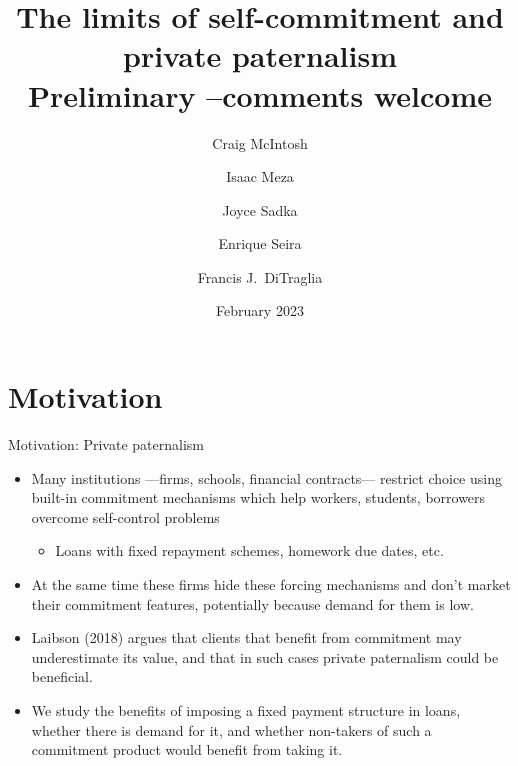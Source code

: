 \documentclass[8pt]{beamer}
\title{The limits of self-commitment and private paternalism \\
Preliminary --comments welcome}
\author{Craig McIntosh \and Isaac Meza \and Joyce Sadka \and Enrique Seira \and Francis J.\ DiTraglia }
\date{February 2023}
\begin{document}
\begin{frame}[c, noframenumbering]%
\titlepage
\end{frame}


\section{Motivation}



\begin{frame}{Motivation: Private paternalism}
\begin{itemize}
    \vfill \item Many institutions —firms, schools, financial contracts— restrict choice using built-in commitment mechanisms which help workers, students, borrowers overcome self-control problems
    \begin{itemize}
        \item Loans with fixed repayment schemes, homework due dates, etc.
    \end{itemize}
    \vfill\item At the same time these firms hide these forcing mechanisms and don’t market their commitment features, potentially because demand for them is low.
    \vfill \item  Laibson (2018) argues that clients that benefit from commitment may underestimate its value, and that in such cases private paternalism could be beneficial.
    \vfill \item  We study the benefits of imposing a fixed payment structure in loans, whether there is demand for it, and whether non-takers of such a commitment product would benefit from taking it.
\end{itemize}

\end{frame}
\end{document}
